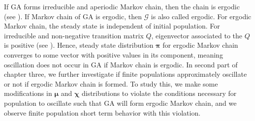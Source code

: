 
If GA forms irreducible and aperiodic Markov chain, then the chain is ergodic (see \cite{MarkovChain}). If Markov chain of GA is ergodic, then $\mathcal{G}$ is also called ergodic. For ergodic Markov chain, the steady state is independent of initial population. For irreducible and non-negative transition matrix $Q$, eigenvector associated to the $Q$ is positive (see \cite{Minc1988}). Hence, steady state distribution $\bm{\pi}$ for ergodic Markov chain converges to some vector with positive values in its component, meaning oscillation does not occur in GA if Markov chain is ergodic. In second part of chapter three, we further investigate if finite populations approximately oscillate or not if ergodic Markov chain is formed. To study this, we make some modifications in $\bm{\mu}$ and $\bm{\chi}$ distributions to  violate the conditions necessary for population to oscillate such that GA will form ergodic Markov chain, and we observe finite population short term behavior with this violation.


